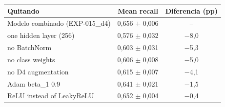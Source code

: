 \begin{tabular}{lcc}
\toprule
Quitando & Mean recall & Diferencia (pp) \\
\midrule
Modelo combinado (EXP-015\_d4) & 0,656 $\pm$ 0,006 & -- \\
one hidden layer (256) & 0,576 $\pm$ 0,032 & $-$8,0 \\
no BatchNorm & 0,603 $\pm$ 0,031 & $-$5,3 \\
no class weights & 0,606 $\pm$ 0,008 & $-$5,0 \\
no D4 augmentation & 0,615 $\pm$ 0,007 & $-$4,1 \\
Adam beta\_1 0.9 & 0,641 $\pm$ 0,021 & $-$1,5 \\
ReLU instead of LeakyReLU & 0,652 $\pm$ 0,004 & $-$0,4 \\
\bottomrule
\end{tabular}
